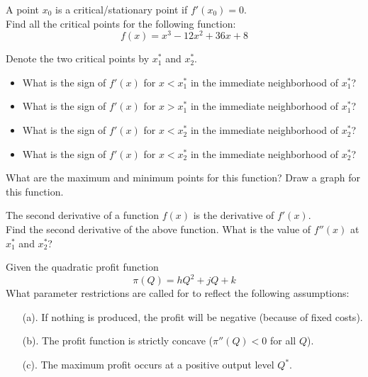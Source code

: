 \documentclass{./../../Latex/handout}
\begin{document}
\thispagestyle{plain}

A point $x_0$ is a critical/stationary point if $f'(x_0)=0$. \\

Find all the critical points for the following function:
$$ f(x)= x^3-12x^2+36x+8 $$


\vspace{5cm}

Denote the two critical points by $x_1^*$ and $x_2^*$. 

\begin{itemize}
  \item What is the sign of $f'(x)$ for $x<x_1^*$ in the immediate neighborhood of $x_1^*$? \\
  \item What is the sign of $f'(x)$ for $x>x_1^*$ in the immediate neighborhood of $x_1^*$? \\
  \item What is the sign of $f'(x)$ for $x<x_2^*$ in the immediate neighborhood of $x_2^*$? \\
  \item What is the sign of $f'(x)$ for $x<x_2^*$ in the immediate neighborhood of $x_2^*$? \\
\end{itemize}

\newpage
What are the maximum and minimum points for this function? Draw a graph for this function. 

\vspace{8cm}

The second derivative of a function $f(x)$ is the derivative of $f'(x)$. \\

Find the second derivative of the above function. What is the value of $f''(x)$ at $x_1^*$ and $x_2^*$? 


\newpage

 Given the quadratic profit function $$\pi(Q)=h Q^2+j Q+k$$ 
 What parameter restrictions are called for to reflect the following assumptions: 
 \begin{itemize}
  \item[(a).] If nothing is produced, the profit will be negative (because of fixed costs).
  \vspace{2cm}
  
  \item[(b).] The profit function is strictly concave ($\pi''(Q)<0$ for all $Q$).
    \vspace{6cm}

  \item[(c).] The maximum profit occurs at a positive output level $Q^*$.
\end{itemize}
\end{document}
